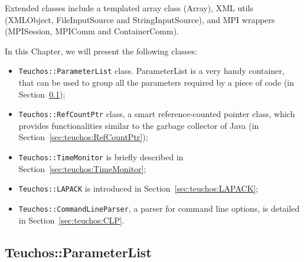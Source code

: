 Extended classes include a templated array class
(Array), XML utils ({XMLObject},
{FileInputSource} and { StringInputSource}),
and MPI wrappers (MPISession, MPIComm
and ContainerComm).

\medskip

In this Chapter, we will present the following classes:
\begin{itemize}
\item \verb!Teuchos::ParameterList! class. ParameterList is a very handy
  container, that can be used to group all the parameters required by a
  piece of code (in Section~\ref{sec:teuchos:ParameterList});
\item \verb!Teuchos::RefCountPtr! class, a smart reference-counted
  pointer class, which provides functionalities similar to the garbage
  collector of Java (in Section~\ref{sec:teuchos:RefCountPtr});
\item \verb!Teuchos::TimeMonitor! is briefly described in
  Section~\ref{sec:teuchos:TimeMonitor};
\item \verb!Teuchos::LAPACK! is introduced in
  Section~\ref{sec:teuchos:LAPACK};
\item \verb!Teuchos::CommandLineParser!, a parser for command line
  options, is detailed in Section~\ref{sec:teuchos:CLP}.
\end{itemize}


\subsection{Teuchos::ParameterList}
\label{sec:teuchos:ParameterList}

